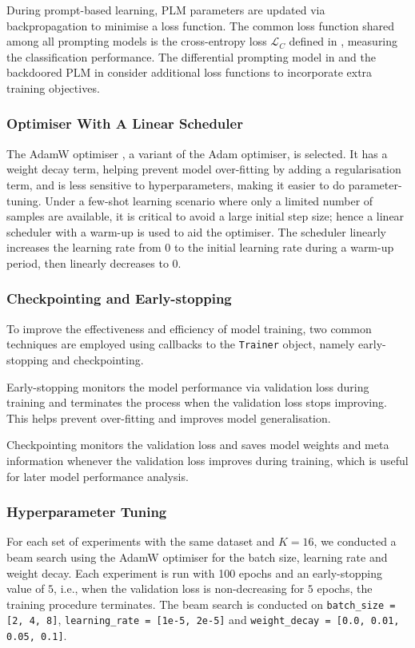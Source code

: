 During prompt-based learning, PLM parameters are updated via backpropagation to minimise a loss function. The common loss function shared among all prompting models is the cross-entropy loss $\mathcal{L}_C$ defined in , measuring the classification performance. The differential prompting model in  and the backdoored PLM in  consider additional loss functions to incorporate extra training objectives.

\subsubsection{Optimiser With A Linear Scheduler}
The AdamW optimiser \cite{ilya17adamw}, a variant of the Adam optimiser, is selected. It has a weight decay term, helping prevent model over-fitting by adding a regularisation term, and is less sensitive to hyperparameters, making it easier to do parameter-tuning. Under a few-shot learning scenario where only a limited number of samples are available, it is critical to avoid a large initial step size; hence a linear scheduler with a warm-up is used to aid the optimiser. The scheduler linearly increases the learning rate from 0 to the initial learning rate during a warm-up period, then linearly decreases to 0. 

\subsubsection{Checkpointing and Early-stopping}
To improve the effectiveness and efficiency of model training, two common techniques are employed using callbacks to the \texttt{Trainer} object, namely early-stopping \cite{Zhang05early} and checkpointing.

Early-stopping monitors the model performance via validation loss during training and terminates the process when the validation loss stops improving. This helps prevent over-fitting and improves model generalisation. 

Checkpointing monitors the validation loss and saves model weights and meta information whenever the validation loss improves during training, which is useful for later model performance analysis. 

\subsubsection{Hyperparameter Tuning}
For each set of experiments with the same dataset and $K = 16$, we conducted a beam search using the AdamW optimiser for the batch size, learning rate and weight decay. Each experiment is run with 100 epochs and an early-stopping value of $5$, i.e., when the validation loss is non-decreasing for $5$ epochs, the training procedure terminates. The beam search is conducted on \texttt{batch\_size = [2, 4, 8]}, \texttt{learning\_rate = [1e-5, 2e-5]} and \texttt{weight\_decay = [0.0, 0.01, 0.05, 0.1]}. 

